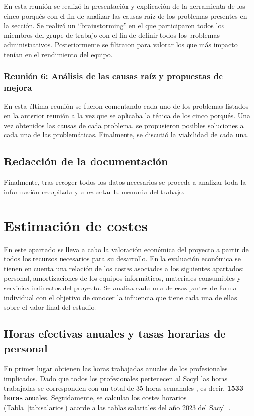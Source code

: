 En esta reunión se realizó la presentación y explicación de la herramienta de los cinco porqués con el fin de analizar las causas raíz de los problemas presentes en la sección.
Se realizó un ``brainstorming'' en el que participaron todos los miembros del grupo de trabajo con el fin de definir todos los problemas administrativos.
Posteriormente se filtraron para valorar los que más impacto tenían en el rendimiento del equipo.

\subsubsection{Reunión 6: Análisis de las causas raíz y propuestas de mejora}

En esta última reunión se fueron comentando cada uno de los problemas listados en la anterior reunión a la vez que se aplicaba la ténica de los cinco porqués.
Una vez obtenidos las causas de cada problema, se propusieron posibles soluciones a cada una de las problemáticas.
Finalmente, se discutió la viabilidad de cada una.

\subsection{Redacción de la documentación}

Finalmente, tras recoger todos los datos necesarios se procede a analizar toda la información recopilada y a redactar la memoria del trabajo.

\section{Estimación de costes}

En este apartado se lleva a cabo la valoración económica del proyecto a partir de todos los recursos necesarios para su desarrollo.
En la evaluación económica se tienen en cuenta una relación de los costes asociados a los siguientes apartados: personal, amortizaciones de los  equipos informáticos, materiales consumibles y servicios indirectos del proyecto.
Se analiza cada una de esas partes de forma individual con el objetivo de conocer la influencia que tiene cada una de ellas sobre el valor final del estudio.

\subsection{Horas efectivas anuales y tasas horarias de personal}

En primer lugar obtienen las horas trabajadas anuales de los profesionales implicados.
Dado que todos los profesionales pertenecen al Sacyl las horas trabajadas se corresponden con un total de 35 horas semanales \cite{noauthor_orden_2022}, es decir, \textbf{1533 horas} anuales.
Seguidamente, se calculan los costes horarios (Tabla~\ref{tab:salarios}) acorde a las tablas salariales del año 2023 del Sacyl~\cite{noauthor_orden_2023}.

